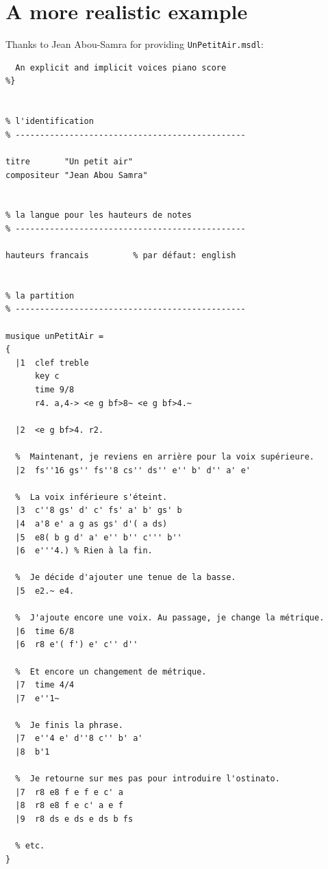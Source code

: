 \section{A more realistic example}

Thanks to Jean Abou-Samra for providing {\tt UnPetitAir.msdl}:
\begin{lstlisting}[language=MSDL]
%{
  An explicit and implicit voices piano score
%}


% l'identification
% -----------------------------------------------

titre       "Un petit air"
compositeur "Jean Abou Samra"


% la langue pour les hauteurs de notes
% -----------------------------------------------

hauteurs francais         % par défaut: english


% la partition
% -----------------------------------------------

musique unPetitAir =
{
  |1  clef treble
      key c
      time 9/8
      r4. a,4-> <e g bf>8~ <e g bf>4.~

  |2  <e g bf>4. r2.

  %  Maintenant, je reviens en arrière pour la voix supérieure.
  |2  fs''16 gs'' fs''8 cs'' ds'' e'' b' d'' a' e'

  %  La voix inférieure s'éteint.
  |3  c''8 gs' d' c' fs' a' b' gs' b
  |4  a'8 e' a g as gs' d'( a ds)
  |5  e8( b g d' a' e'' b'' c''' b''
  |6  e'''4.) % Rien à la fin.

  %  Je décide d'ajouter une tenue de la basse.
  |5  e2.~ e4.

  %  J'ajoute encore une voix. Au passage, je change la métrique.
  |6  time 6/8
  |6  r8 e'( f') e' c'' d''

  %  Et encore un changement de métrique.
  |7  time 4/4
  |7  e''1~

  %  Je finis la phrase.
  |7  e''4 e' d''8 c'' b' a'
  |8  b'1

  %  Je retourne sur mes pas pour introduire l'ostinato.
  |7  r8 e8 f e f e c' a
  |8  r8 e8 f e c' a e f
  |9  r8 ds e ds e ds b fs

  % etc.
}
\end{lstlisting}


